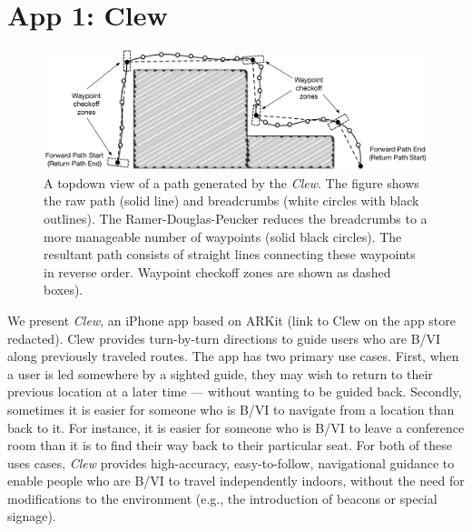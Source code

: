\documentclass[chi_draft]{sigchi}
\newcommand{\BVI}{B/VI\xspace}
\begin{document}
\section{App 1: Clew}


\begin{figure}
\begin{center}
\includegraphics[width=\linewidth]{Figures/samplepath}
\end{center}
\caption{A topdown view of a path generated by the \emph{Clew}.  The figure shows the raw path (solid line) and breadcrumbs (white circles with black outlines).  The Ramer-Douglas-Peucker reduces the breadcrumbs to a more manageable number of waypoints (solid black circles).  The resultant path consists of straight lines connecting these waypoints in reverse order.  Waypoint checkoff zones are shown as dashed boxes).\label{fig:samplepath}}
\end{figure}

We present \emph{Clew}, an iPhone app based on ARKit (link to Clew on the app store redacted).  Clew provides turn-by-turn directions to guide users who are \BVI along previously traveled routes.  The app has two primary use cases.  First, when a user is led somewhere by a sighted guide, they may wish to return to their previous location at a later time --- without wanting to be guided back.  Secondly, sometimes it is easier for someone who is \BVI to navigate from a location than back to it.  For instance, it is easier for someone who is \BVI to leave a conference room than it is to find their way back to their particular seat.  For both of these uses cases, \emph{Clew} provides high-accuracy, easy-to-follow, navigational guidance to enable people who are \BVI to travel independently indoors, without the need for modifications to the environment (e.g., the introduction of beacons or special signage).  
\end{document}
